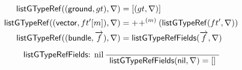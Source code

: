 {\begin{align*}
{\sf listGTypeRef}(({\sf ground}, gt), \nabla) & = [(gt, \nabla)]\\ 
{\sf listGTypeRef}(({\sf vector}, ft'[m]), \nabla) & =  
+\!+^{(m)}({\sf listGTypeRef}(ft', \nabla))\\
{\sf listGTypeRef}(({\sf bundle}, \overrightarrow{f}), \nabla) & = {\sf listGTypeRefFields}(\overrightarrow{f}, \nabla)
\end{align*}

\begin{figure}[htbp]
\begin{gather*}
	\infernone[\listgtypereffields: nil]
	{\seqq{\listgtypereffields(\nil, \flipped) = []}}

\end{gather*}
\end{figure}}
